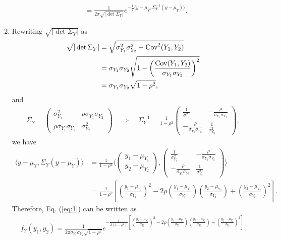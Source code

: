 \begin{enumerate}
\begin{align*}
	& = \frac{1}{2\pi \sqrt{|\det \Sigma_Y|}} e^{-\frac{1}{2}\langle y - \mu_Y, \Sigma_Y^{-1}(y - \mu_Y)\rangle}.
	\end{align*}
	\item Rewriting $\sqrt{|\det \Sigma_Y|}$ as
	\begin{align*}
	\sqrt{|\det \Sigma_Y|} & = \sqrt{\sigma_{Y_1}^2\sigma_{Y_2}^2 - \mathrm{Cov}^2(Y_1, Y_2)} \\
	& = \sigma_{Y_1}\sigma_{Y_2}\sqrt{1 - \left(\frac{\mathrm{Cov}(Y_1, Y_2)}{\sigma_{Y_1}\sigma_{Y_2}} \right)^2} \\
	& = \sigma_{Y_1}\sigma_{Y_2}\sqrt{1-\rho^2},
	\end{align*}
	and
	\begin{align*}
	\Sigma_Y = \begin{pmatrix}
	\sigma_{Y_1}^2 & \rho\sigma_{Y_1}\sigma_{Y_2} \\
	\rho\sigma_{Y_1}\sigma_{Y_2} & \sigma_{Y_2}^2
	\end{pmatrix} \quad\Rightarrow\quad \Sigma_Y^{-1} = \frac{1}{1-\rho^2}\begin{pmatrix}
	\frac{1}{\sigma_{Y_1}^2} & -\frac{\rho}{\sigma_{Y_1}\sigma_{Y_2}} \\
	-\frac{\rho}{\sigma_{Y_1}\sigma_{Y_2}} & \frac{1}{\sigma_{Y_2}^2}
	\end{pmatrix},
	\end{align*}
	we have
	\begin{align*}
	\langle y-\mu_Y, \Sigma_Y(y-\mu_Y)\rangle & = \frac{1}{1-\rho^2}\langle \begin{pmatrix}
	y_1-\mu_{Y_1} \\ y_2-\mu_{Y_2}
	\end{pmatrix}, \begin{pmatrix}
	\frac{1}{\sigma_{Y_1}^2} & -\frac{\rho}{\sigma_{Y_1}\sigma_{Y_2}} \\
	-\frac{\rho}{\sigma_{Y_1}\sigma_{Y_2}} & \frac{1}{\sigma_{Y_2}^2}
	\end{pmatrix}\rangle \\
	& = \frac{1}{1-\rho^2} \left[\left(\frac{y_1-\mu_{Y_1}}{\sigma_{Y_1}} \right)^2 - 2\rho\left(\frac{y_1-\mu_{Y_1}}{\sigma_{Y_1}} \right)\left(\frac{y_2-\mu_{Y_2}}{\sigma_{Y_2}} \right) + \left(\frac{y_2-\mu_{Y_2}}{\sigma_{Y_2}} \right)^2  \right].
	\end{align*}
	Therefore, Eq. (\ref{eq:1}) can be written as
	\begin{align*}
	f_Y(y_1, y_2) = \frac{1}{2\pi \sigma_{Y_1}\sigma_{Y_2}\sqrt{1-\rho^2}} e^{-\frac{1}{2(1-\rho^2)}\left[\left(\frac{y_1 - \mu_{Y_1}}{\sigma_{Y_1}} \right)^2 - 2\rho\left(\frac{y_1-\mu_{Y_1}}{\sigma_{Y_1}} \right)\left(\frac{y_2 - \mu_{Y_2}}{\sigma_{Y_2}} \right) + \left(\frac{y_2 - \mu_{Y_2}}{\sigma_{Y_2}} \right)^2 \right]}.
	\end{align*}
\end{enumerate}


